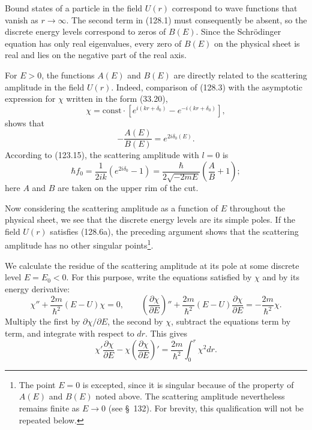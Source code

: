 Bound states of a particle in the field $U(r)$ correspond to wave functions that vanish as $r\to\infty$. The second term in (128.1) must consequently be absent, so the discrete energy levels correspond to zeros of $B(E)$. Since the Schrödinger equation has only real eigenvalues, every zero of $B(E)$ on the physical sheet is real and lies on the negative part of the real axis.

For $E>0$, the functions $A(E)$ and $B(E)$ are directly related to the scattering amplitude in the field $U(r)$. Indeed, comparison of (128.3) with the asymptotic expression for $\chi$ written in the form (33.20),
\begin{equation}
 \chi=\mathrm{const}\cdot[e^{i(kr+\delta_0)}-e^{-i(kr+\delta_0)}],
 \tag{128.7}
\end{equation}
shows that
\begin{equation}
 -\frac{A(E)}{B(E)}=e^{2i\delta_0(E)}.
 \tag{128.8}
\end{equation}
According to (123.15), the scattering amplitude with $l=0$ is
\begin{equation}
 \hbar f_0=\frac1{2ik}(e^{2i\delta_0}-1)
 =\frac{\hbar}{2\sqrt{-2mE}}\left(\frac AB+1\right);
 \tag{128.9}
\end{equation}
here $A$ and $B$ are taken on the upper rim of the cut.

Now considering the scattering amplitude as a function of $E$ throughout the physical sheet, we see that the discrete energy levels are its simple poles. If the field $U(r)$ satisfies (128.6a), the preceding argument shows that the scattering amplitude has no other singular points\footnote{The point $E=0$ is excepted, since it is singular because of the property of $A(E)$ and $B(E)$ noted above. The scattering amplitude nevertheless remains finite as $E\to0$ (see §~132). For brevity, this qualification will not be repeated below.}.

We calculate the residue of the scattering amplitude at its pole at some discrete level $E=E_0<0$. For this purpose, write the equations satisfied by $\chi$ and by its energy derivative:
\[
 \chi''+\frac{2m}{\hbar^2}(E-U)\chi=0,\qquad
 \left(\frac{\partial\chi}{\partial E}\right)''
 +\frac{2m}{\hbar^2}(E-U)\frac{\partial\chi}{\partial E}
 =-\frac{2m}{\hbar^2}\chi.
\]
Multiply the first by $\partial\chi/\partial E$, the second by $\chi$, subtract the equations term by term, and integrate with respect to $dr$. This gives
\begin{equation}
 \chi'\frac{\partial\chi}{\partial E}-\chi\left(\frac{\partial\chi}{\partial E}\right)'
 =\frac{2m}{\hbar^2}\int_0^r\chi^2dr.
 \tag{128.10}
\end{equation}

